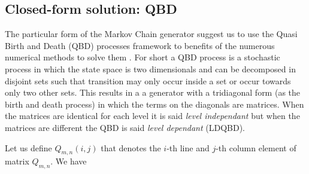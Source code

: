 \documentclass[conference]{IEEEtran}
\begin{document}
\subsection{Closed-form solution:  QBD}

The particular form of the Markov Chain generator suggest us to use the Quasi Birth and Death (QBD) processes framework to benefits of the numerous
numerical methods to solve them \cite{Neuts1981}. For short a QBD process is a stochastic process in which the state space is two dimensionals and can 
be decomposed in disjoint sets such that transition may only occur inside a set or occur towards only two other sets.
This results in a a generator with a tridiagonal form (as the birth and death process) in which the terms on the diagonals are matrices.
When the matrices are identical for each level it is said \emph{level independant} but when the matrices are different  the QBD
is said \emph{level dependant} (LDQBD).


Let us define $Q_{m,n}(i,j)$ that denotes the $i$-th line and $j$-th column element of matrix $Q_{m,n}$. We have
\end{document}
